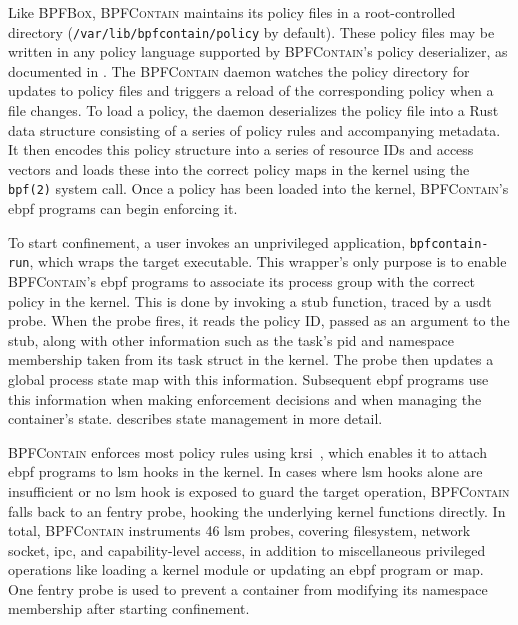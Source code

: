 \documentclass[
  fontsize=12pt,
  titlepage=firstiscover,
  paper=letter,
oneside,
  cleardoublepage=plain,
  parskip=half-,
  DIV=10,
  parindent,
  appendixprefix,
  chapterprefix,
  listof=totoc,
]{scrbook}
\newcommand{\bpfbox}{\textsc{BPFBox}}
\newcommand{\bpfcontain}{\textsc{BPFContain}}
\begin{document}
Like \bpfbox{}, \bpfcontain{} maintains its policy files in a root-controlled directory
(\texttt{/var/lib/bpfcontain/policy} by default). These policy files may be written in any
policy language supported by \bpfcontain{}'s policy deserializer, as documented in
. The \bpfcontain{} daemon watches the policy directory for
updates to policy files and triggers a reload of the corresponding policy when a file
changes. To load a policy, the daemon deserializes the policy file into a Rust data
structure consisting of a series of policy rules and accompanying metadata. It then
encodes this policy structure into a series of resource IDs and access vectors and loads
these into the correct policy maps in the kernel using the \texttt{bpf(2)} system call.
Once a policy has been loaded into the kernel, \bpfcontain{}'s \gls{ebpf} programs can
begin enforcing it.

To start confinement, a user invokes an unprivileged application, \texttt{bpfcontain-run},
which wraps the target executable. This wrapper's only purpose is to enable
\bpfcontain{}'s \gls{ebpf} programs to associate its process group with the correct policy
in the kernel.  This is done by invoking a stub function, traced by a \gls{usdt} probe.
When the probe fires, it reads the policy ID, passed as an argument to the stub, along
with other information such as the task's \gls{pid} and namespace membership taken from
its task struct in the kernel. The probe then updates a global process state map with this
information. Subsequent \gls{ebpf} programs use this information when making enforcement
decisions and when managing the container's state.  describes
state management in more detail.

\bpfcontain{} enforces most policy rules using \gls{krsi}~\cite{singh2019_krsi}, which
enables it to attach \gls{ebpf} programs to \gls{lsm} hooks in the kernel. In cases where
\gls{lsm} hooks alone are insufficient or no \gls{lsm} hook is exposed to guard the target
operation, \bpfcontain{} falls back to an fentry probe, hooking the underlying kernel
functions directly. In total, \bpfcontain{} instruments 46 \gls{lsm} probes, covering
filesystem, network socket, \gls{ipc}, and capability-level access, in addition to
miscellaneous privileged operations like loading a kernel module or updating an \gls{ebpf}
program or map. One fentry probe is used to prevent a container from modifying its
namespace membership after starting confinement.
\end{document}
